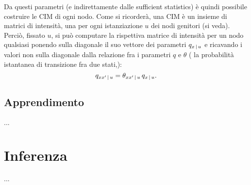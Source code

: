 Da questi parametri (e indirettamente dalle sufficient statistics) è quindi possibile costruire le \acl{CIM} di ogni nodo. Come si ricorderà, una \acs{CIM} è un insieme di matrici di intensità, una per ogni istanziazione $u$ dei nodi genitori (si veda). Perciò, fissato $u$, si può computare la rispettiva matrice di intensità per un nodo qualsiasi ponendo sulla diagonale il suo vettore dei parametri $q_{x\,\arrowvert\,u}$ e ricavando i valori non sulla diagonale dalla relazione fra i parametri $q$ e $\theta$ (\ie{} la probabilità istantanea di transizione fra due stati,):
\[
q_{xx^\prime\,\arrowvert\,u}=\theta_{xx^\prime\,\arrowvert\,u}\,q_{x\,\arrowvert\,u}\text{.}
\]

\subsection{Apprendimento}
\label{sec:ctbn-learning}
...

\section{Inferenza}
\label{sec:ctbn-inferenza}
...









